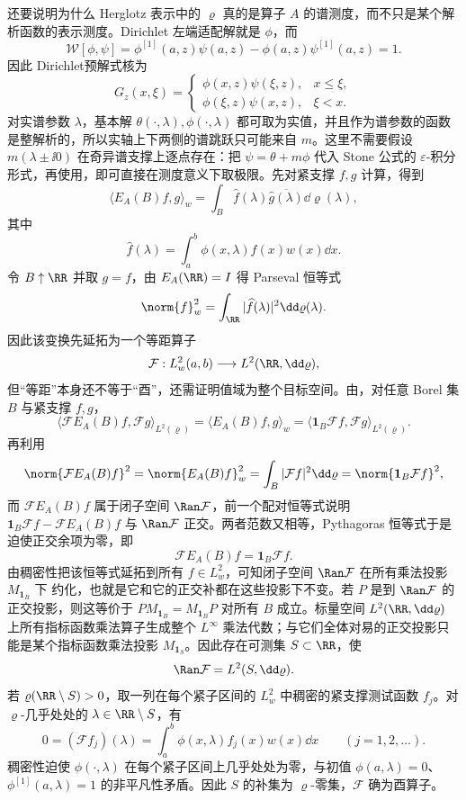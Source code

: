 还要说明为什么 Herglotz 表示中的 $\varrho$ 真的是算子 $A$ 的谱测度，而不只是某个解析函数的表示测度。Dirichlet 左端适配解就是 $\phi$，而
\[
 \mathcal W[\phi,\psi]
 =\phi^{[1]}(a,z)\psi(a,z)-\phi(a,z)\psi^{[1]}(a,z)=1.
\]
因此 Dirichlet预解式核为
\[
 G_z(x,\xi)=
 \begin{cases}
  \phi(x,z)\psi(\xi,z),&x\le\xi,\\
  \phi(\xi,z)\psi(x,z),&\xi<x.
 \end{cases}
\]
对实谱参数 $\lambda$，基本解 $\theta(\cdot,\lambda),\phi(\cdot,\lambda)$ 都可取为实值，并且作为谱参数的函数是整解析的，所以实轴上下两侧的谱跳跃只可能来自 $m$。这里不需要假设 $m(\lambda\pm\ii0)$ 在奇异谱支撑上逐点存在：把 $\psi=\theta+m\phi$ 代入 Stone 公式的 $\varepsilon$-积分形式，再使用，即可直接在测度意义下取极限。先对紧支撑 $f,g$ 计算，得到
\begin{equation}\label{eq:math-sl-weyl-stone-pairing}
 \langle E_A(B)f,g\rangle_w
 =\int_B \widehat f(\lambda)
 \overline{\widehat g(\lambda)}\dd\varrho(\lambda),
\end{equation}
其中
\[
 \widehat f(\lambda)=\int_a^b\phi(x,\lambda)f(x)w(x)\dd x.
\]
令 $B\uparrow\RR$ 并取 $g=f$，由 $E_A(\RR)=I$ 得 Parseval 恒等式
\[
 \norm{f}_w^2
 =\int_{\RR}|\widehat f(\lambda)|^2\dd\varrho(\lambda).
\]
因此该变换先延拓为一个等距算子
\[
 \mathcal F:L^2_w(a,b)\longrightarrow L^2(\RR,\dd\varrho),
\]
但“等距”本身还不等于“酉”，还需证明值域为整个目标空间。由，对任意 Borel 集 $B$ 与紧支撑 $f,g$，
\[
 \langle \mathcal F E_A(B)f,\mathcal Fg\rangle_{L^2(\varrho)}
 =\langle E_A(B)f,g\rangle_w
 =\langle \mathbf1_B\mathcal Ff,\mathcal Fg\rangle_{L^2(\varrho)}.
\]
再利用
\[
 \norm{\mathcal F E_A(B)f}^2
 =\norm{E_A(B)f}_w^2
 =\int_B|\mathcal Ff|^2\dd\varrho
 =\norm{\mathbf1_B\mathcal Ff}^2,
\]
而 $\mathcal F E_A(B)f$ 属于闭子空间 $\Ran\mathcal F$，前一个配对恒等式说明
$\mathbf1_B\mathcal Ff-\mathcal F E_A(B)f$ 与 $\Ran\mathcal F$ 正交。两者范数又相等，Pythagoras 恒等式于是迫使正交余项为零，即
\[
 \mathcal F E_A(B)f=\mathbf1_B\mathcal Ff.
\]
由稠密性把该恒等式延拓到所有 $f\in L^2_w$，可知闭子空间 $\Ran\mathcal F$ 在所有乘法投影 $M_{\mathbf1_B}$ 下 约化，也就是它和它的正交补都在这些投影下不变。若 $P$ 是到 $\Ran\mathcal F$ 的正交投影，则这等价于 $P M_{\mathbf1_B}=M_{\mathbf1_B}P$ 对所有 $B$ 成立。标量空间 $L^2(\RR,\dd\varrho)$ 上所有指标函数乘法算子生成整个 $L^\infty$ 乘法代数；与它们全体对易的正交投影只能是某个指标函数乘法投影 $M_{\mathbf1_S}$。因此存在可测集 $S\subset\RR$，使
\[
 \Ran\mathcal F=L^2(S,\dd\varrho).
\]
若 $\varrho(\RR\setminus S)>0$，取一列在每个紧子区间的 $L^2_w$ 中稠密的紧支撑测试函数 $f_j$。对 $\varrho$-几乎处处的 $\lambda\in\RR\setminus S$，有
\[
 0=(\mathcal Ff_j)(\lambda)
 =\int_a^b\phi(x,\lambda)f_j(x)w(x)\dd x
 \qquad(j=1,2,\ldots).
\]
稠密性迫使 $\phi(\cdot,\lambda)$ 在每个紧子区间上几乎处处为零，与初值 $\phi(a,\lambda)=0$、$\phi^{[1]}(a,\lambda)=1$ 的非平凡性矛盾。因此 $S$ 的补集为 $\varrho$-零集，$\mathcal F$ 确为酉算子。

